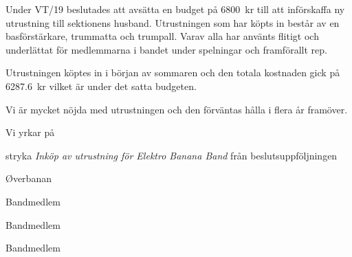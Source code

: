 \documentclass[../_main/handlingar.tex]{subfiles}
\begin{document}
Under VT/19 beslutades att avsätta en budget på \SI{6800}{kr} till att införskaffa ny utrustning till sektionens husband. Utrustningen som har köpts in består av en basförstärkare, trummatta och trumpall. Varav alla har använts flitigt och underlättat för medlemmarna i bandet under spelningar och framförallt rep.

Utrustningen köptes in i början av sommaren och den totala kostnaden gick på \SI{6287,6}{kr} vilket är under det satta budgeten.

Vi är mycket nöjda med utrustningen och den förväntas hålla i flera år framöver.

Vi yrkar på

\begin{attsatser}
    \att stryka \textit{Inköp av utrustning för Elektro Banana Band} från beslutsuppföljningen
\end{attsatser}

\begin{signatures}{4}
    \mvh
    \signature{William Sjödin}{Øverbanan}
    \signature{Daniel Bakic}{Bandmedlem}
    \signature{Oskar Magnusson}{Bandmedlem}
    \signature{Valter Möller}{Bandmedlem}
\end{signatures}
\end{document}

